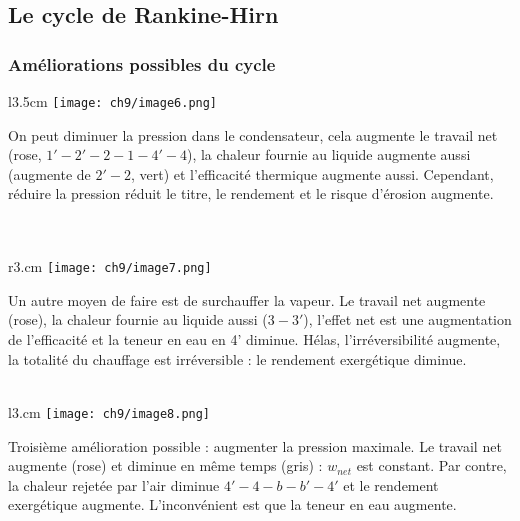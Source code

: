 	\subsection{Le cycle de Rankine-Hirn}
		\subsubsection{Améliorations possibles du cycle}
		\begin{wrapfigure}[8]{l}{3.5cm}
		\vspace{-5mm}
		\texttt{[image: ch9/image6.png]}
		\end{wrapfigure}
		On peut diminuer la pression dans le condensateur, cela augmente le 
		travail net (rose, $1'-2'-2-1-4'-4$), la chaleur fournie au liquide 
		augmente aussi (augmente de $2'-2$, vert) et l'efficacité thermique 
		augmente aussi. Cependant, réduire la pression réduit le titre, le rendement et le 
		risque d'érosion augmente.\\\\
		\\
		
		
		\begin{wrapfigure}[8]{r}{3.cm}
		\vspace{-15mm}
		\texttt{[image: ch9/image7.png]}
		\end{wrapfigure}
		Un autre moyen de faire est de surchauffer la vapeur. Le travail net 
		augmente (rose), la chaleur fournie au liquide aussi ($3-3'$), l'effet 
		net est une augmentation de l’efficacité et la teneur en eau en 4' 
		diminue. Hélas, l'irréversibilité augmente, la totalité du chauffage 
		est irréversible : le rendement exergétique diminue.\\\\
		
		
		\begin{wrapfigure}[7]{l}{3.cm}
		\vspace{-8mm}
		\texttt{[image: ch9/image8.png]}
		\end{wrapfigure}		
		Troisième amélioration possible : augmenter la pression maximale. Le 
		travail net augmente (rose) et diminue en même temps (gris) : $w_{net}$ 
		est constant. Par contre, la chaleur rejetée par l'air diminue $4'-4-b
		-b'-4'$ et le rendement exergétique augmente. L'inconvénient est que la 
		teneur en eau augmente.\\
		\\
		
